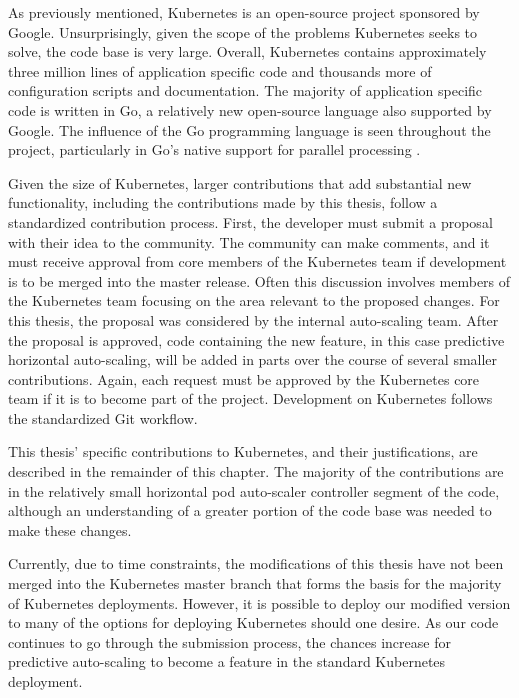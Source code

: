 As previously mentioned, Kubernetes is an
open-source project sponsored by Google. Unsurprisingly, given the scope of the
problems Kubernetes seeks to solve, the code base is very large. Overall,
Kubernetes contains approximately three million lines of application specific
code and thousands more of configuration scripts and documentation. The majority
of application specific code is written in Go, a relatively new open-source
language also supported by Google. The influence of the Go programming language
is seen throughout the project, particularly in Go's native support for parallel
processing \cite{golang}.

Given the size of Kubernetes, larger contributions that add substantial new functionality,
including the contributions made by this thesis, follow a standardized contribution process.
First, the developer must submit a proposal with their idea to the community.
The community can make comments, and it must receive approval from core members
of the Kubernetes team if development is to be merged into the master release. Often
this discussion involves members of the Kubernetes team focusing on the area
relevant to the proposed changes. For this thesis, the proposal was considered
by the internal auto-scaling team. After the proposal is approved, code
containing the new feature, in this case predictive horizontal auto-scaling,
will be added in parts over the course of several smaller contributions. Again,
each request must be approved by the Kubernetes core team if it is to become
part of the project. Development on Kubernetes follows the standardized Git workflow.

This thesis' specific contributions to Kubernetes, and their justifications,
are described in the remainder of this chapter. The majority of the
contributions are in the relatively small horizontal pod auto-scaler controller
segment of the code, although an understanding of a greater portion of the code
base was needed to make these changes.

Currently, due to time constraints, the modifications of
this thesis have not been merged into the
Kubernetes master branch that forms the basis for the majority of Kubernetes
deployments. However, it is possible to deploy our modified version to many of
the options for deploying Kubernetes should one desire. As our code continues to
go through the submission process, the chances increase for predictive
auto-scaling to become a feature in the standard Kubernetes deployment.

